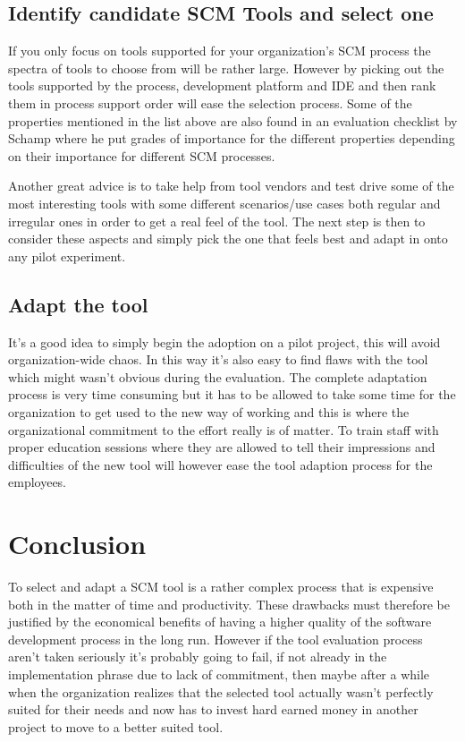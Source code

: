 \documentclass[10pt]{article}
\begin{document}
\subsection{Identify candidate SCM Tools and select one}
If you only focus on tools supported for your organization's SCM process the spectra of tools to choose from will be rather large. However by picking out the tools supported by the process, development platform and IDE and then rank them in process support order will ease the selection process. \cite{Sayko}
Some of the properties mentioned in the list above are also found in an evaluation checklist by Schamp \cite{Schamp} where he put grades of importance for the different properties depending on their importance for different SCM processes.

\noindent Another great advice is to take help from tool vendors and test drive some of the most interesting tools with some different scenarios/use cases both regular and irregular ones in order to get a real feel of the tool.\cite{Sayko} The next step is then to consider these aspects and simply pick the one that feels best and adapt in onto any pilot experiment.

\subsection{Adapt the tool}
It's a good idea to simply begin the adoption on a pilot project, this will avoid organization-wide chaos.\cite{Sayko} In this way it's also easy to find flaws with the tool which might wasn't obvious during the evaluation. 
The complete adaptation process is very time consuming but it has to be allowed to take some time for the organization to get used to the new way of working and this is where the organizational commitment to the effort really is of matter. To train staff with proper education sessions where they are allowed to tell their impressions and difficulties of the new tool will however ease the tool adaption process for the employees.\cite{Sayko}

\section{Conclusion}
To select and adapt a SCM tool is a rather complex process that is expensive both in the matter of time and productivity. These drawbacks must therefore be justified by the economical benefits of having a higher quality of the software development process in the long run. However if the tool evaluation process aren't taken seriously it's probably going to fail, if not already in the implementation phrase due to lack of commitment, then maybe after a while when the organization realizes that the selected tool actually wasn't perfectly suited for their needs and now has to invest hard earned money in another project to move to a better suited tool.
\end{document}

